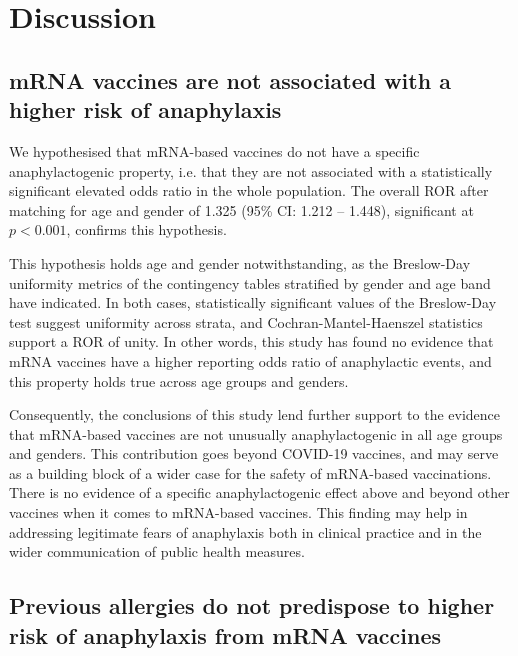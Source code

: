 \documentclass{article}
\begin{document}
\section{Discussion}

\subsection{mRNA vaccines are not associated with a higher risk of anaphylaxis}

We hypothesised that mRNA-based vaccines do not have a specific anaphylactogenic property, i.e. that they are not associated with a statistically significant elevated odds ratio in the whole population.
The overall ROR after matching for age and gender of 1.325 (95\% CI: 1.212 -- 1.448), significant at $p<0.001$, confirms this hypothesis.

This hypothesis holds age and gender notwithstanding, as the Breslow-Day uniformity metrics of the contingency tables stratified by gender and age band have indicated.
In both cases, statistically significant values of the Breslow-Day test suggest uniformity across strata, and Cochran-Mantel-Haenszel statistics support a ROR of unity.
In other words, this study has found no evidence that mRNA vaccines have a higher reporting odds ratio of anaphylactic events, and this property holds true across age groups and genders.

Consequently, the conclusions of this study lend further support to the evidence that mRNA-based vaccines are not unusually anaphylactogenic in all age groups and genders.
This contribution goes beyond COVID-19 vaccines, and may serve as a building block of a wider case for the safety of mRNA-based vaccinations.
There is no evidence of a specific anaphylactogenic effect above and beyond other vaccines when it comes to mRNA-based vaccines.
This finding may help in addressing legitimate fears of anaphylaxis both in clinical practice and in the wider communication of public health measures.


\subsection{Previous allergies do not predispose to higher risk of anaphylaxis from mRNA vaccines}
\end{document}
